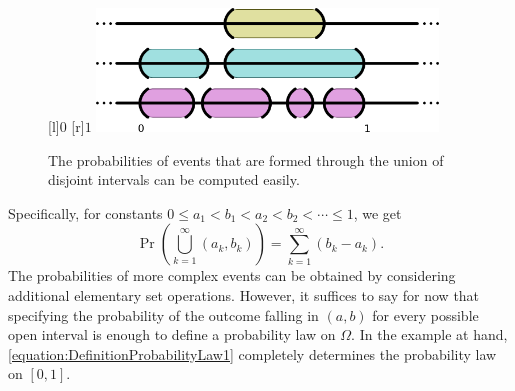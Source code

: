 \begin{figure}[htb!]
\begin{center}
\begin{psfrags}
[l]{$0$}
[r]{$1$}
\includegraphics[height=3.28cm]{Figures/2Chapter/lineintervals}
\end{psfrags}
\caption{The probabilities of events that are formed through the union of disjoint intervals can be computed easily.}
\end{center}
\end{figure}

Specifically, for constants $0 \leq a_1 < b_1 < a_2 < b_2 < \cdots \leq 1$, we get
\begin{equation*}
\Pr \left( \bigcup_{k=1}^{\infty} (a_k,b_k) \right)
= \sum_{k=1}^{\infty} \left( b_k - a_k \right) .
\end{equation*}
The probabilities of more complex events can be obtained by considering additional elementary set operations.
However, it suffices to say for now that specifying the probability of the outcome falling in $(a,b)$ for every possible open interval is enough to define a probability law on $\Omega$.
In the example at hand, \eqref{equation:DefinitionProbabilityLaw1} completely determines the probability law on $[0,1]$.

